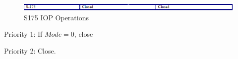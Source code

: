 \begin{figure}[!h]
  \begin{center}
  \includegraphics[width=6.5in]{../figs/S175_IOPops.png}
  \caption{S175 IOP Operations}
  \label{fig:S175iop}
  \end{center}
\end{figure}


\begin{packed_items}
\item Priority 1: If $Mode=0$, close
\item Priority 2: Close.
\end{packed_items}


%
%



\clearpage

